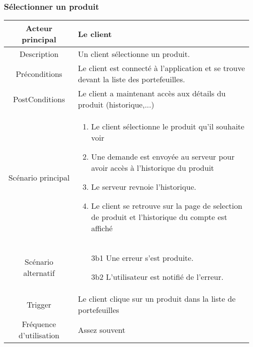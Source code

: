 \documentclass{article}
\begin{document}
\subsubsection{Sélectionner un produit}
\begin{table}[h]
      \begin{tabular}{|c|p{10cm}|}
         \hline
         Acteur principal&Le client \\
         \hline
         Description&Un client sélectionne un produit.\\
         \hline
         Préconditions&Le client est connecté à l'application et se trouve devant la liste des portefeuilles.\\
         \hline
         PostConditions&Le client a maintenant accès aux détails du produit (historique,...)\\
         \hline
         Scénario principal& 
               \begin{enumerate}
                  \item Le client sélectionne le produit qu'il souhaite voir
                  \item Une demande est envoyée au serveur pour avoir accès à l'historique du produit
                  \item Le serveur revnoie l'historique.
                  \item Le client se retrouve sur la page de selection de produit et l'historique du compte est affiché
               \end{enumerate}     \\
         \hline
         Scénario alternatif&
               \begin{itemize}
                  \item[3b1] Une erreur s'est produite.
                  \item[3b2] L'utilisateur est notifié de l'erreur.  
               \end{itemize}\\
         \hline
         Trigger&Le client clique sur un produit dans la liste de portefeuilles\\
         \hline
         Fréquence d'utilisation&Assez souvent\\
         \hline
      \end{tabular}
\end{table}

\newpage
\end{document}
